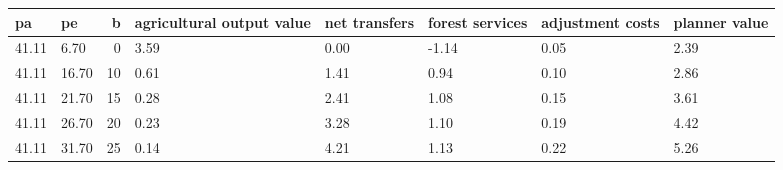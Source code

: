 \begin{tabular}{llrlllll}
\toprule
pa & pe & b & agricultural output value & net transfers & forest services & adjustment costs & planner value \\
\midrule
41.11 & 6.70 & 0 & 3.59 & 0.00 & -1.14 & 0.05 & 2.39 \\
41.11 & 16.70 & 10 & 0.61 & 1.41 & 0.94 & 0.10 & 2.86 \\
41.11 & 21.70 & 15 & 0.28 & 2.41 & 1.08 & 0.15 & 3.61 \\
41.11 & 26.70 & 20 & 0.23 & 3.28 & 1.10 & 0.19 & 4.42 \\
41.11 & 31.70 & 25 & 0.14 & 4.21 & 1.13 & 0.22 & 5.26 \\
\bottomrule
\end{tabular}
